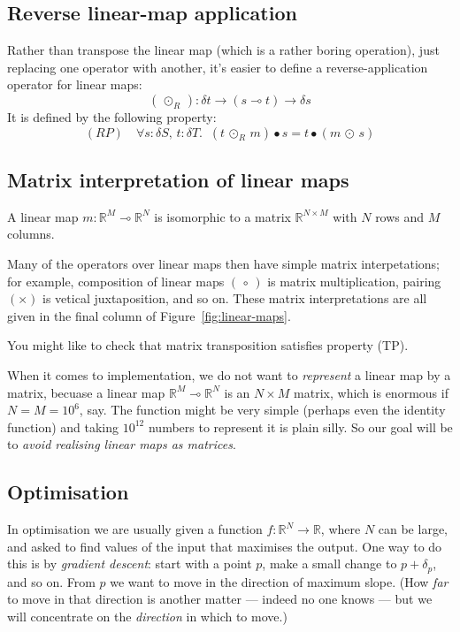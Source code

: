 \documentclass[sigplan,review]{acmart}
\renewcommand{\to}{\rightarrow}    %
\newcommand{\linto}{\multimap}     %
\newcommand{\tangent}[1]{\delta #1}
\renewcommand{\d}[1]{\delta_{\mathit{#1}}}   %
\newcommand{\tcolon}{\!:\!}
\newcommand{\real}{\mathbb{R}}       %
\newcommand{\dotprod}{\bullet}    %
\newcommand{\lmcomp}{\,\circ\,}   %
\newcommand{\lmvcat}{\times}         %
\newcommand{\lmapply}{\,\odot\,}      %
\newcommand{\lmapplyR}{\,\odot_R\,}      %
\begin{document}
\subsection{Reverse linear-map application}

Rather than transpose the linear map (which is a rather boring operation), just replacing
one operator with another, it's easier to define a reverse-application operator for
linear maps:
$$
(\lmapplyR)  :  \tangent{t} \to (s \linto t) \to \tangent{s}
$$
It is defined by the following property:
$$
(RP) \quad \forall s\tcolon \tangent{S},\, t \tcolon \tangent{T}.\;\;
     (t \lmapplyR m) \dotprod s =  t \dotprod (m \lmapply s)
$$

\subsection{Matrix interpretation of linear maps} \label{sec:matrix-rep}

A linear map $m \tcolon \real^M \linto \real^N$ is isomorphic to a matrix $\real^{N \times M}$ with $N$ rows and $M$ columns.

Many of the operators over linear maps then have simple matrix interpetations; for example, composition of
linear maps $(\lmcomp)$ is matrix multiplication, pairing $(\lmvcat)$ is vetical juxtaposition, and so on.
These matrix interpretations are all given in the final column of Figure~\ref{fig:linear-maps}.

You might like to check that matrix transposition satisfies property (TP).

When it comes to implementation, we do not want to \emph{represent} a linear map by a matrix,
becuase a linear map $\real^M \linto \real^N$ is an $N \times M$ matrix, which is
enormous if $N = M = 10^6$, say.  The function might be very simple (perhaps even the identity
function) and taking $10^{12}$ numbers to represent it is plain silly.  So our goal will be
to \emph{avoid realising linear maps as matrices}.

\subsection{Optimisation}

In optimisation we are usually given a function $f : \real^N \to \real$, where $N$ can be large,
and asked to
find values of the input that maximises the output.  One way to do this is by \emph{gradient descent}:
start with a point $p$, make a small change to $p+\d{p}$, and so on.  From $p$ we want
to move in the direction of maximum slope.  (How \emph{far} to move in that
direction is another matter --- indeed no one knows ---
but we will concentrate on the \emph{direction} in which to move.)
\end{document}
